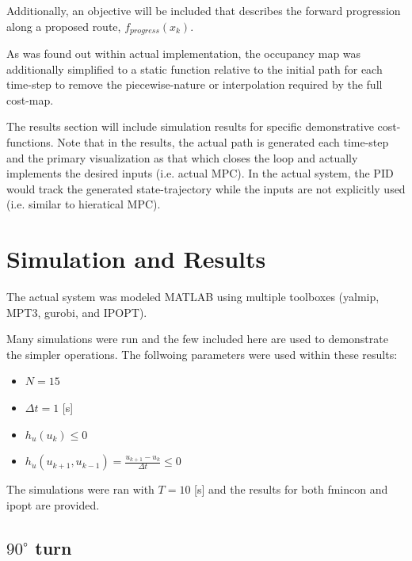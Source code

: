 \documentclass[]{IEEEtran}
\begin{document}
Additionally, an objective will be included that describes the forward progression along a proposed route, $f_{progress}(x_k)$.

As was found out within actual implementation, the occupancy map was additionally simplified to a static function relative to the initial path for each time-step to remove the piecewise-nature or interpolation required by the full cost-map.

The results section will include simulation results for specific demonstrative cost-functions.
Note that in the results, the actual path is generated each time-step and the primary visualization as that which closes the loop and actually implements the desired inputs (i.e. actual MPC).
In the actual system, the PID would track the generated state-trajectory while the inputs are not explicitly used (i.e. similar to hieratical MPC).

\section{Simulation and Results}\label{sec:sim_and_results}

The actual system was modeled MATLAB using multiple toolboxes (yalmip\cite{yalmip}, MPT3\cite{MPT3}, gurobi\cite{gurobi}, and IPOPT\cite{ipopt}).

Many simulations were run and the few included here are used to demonstrate the simpler operations.
The follwoing parameters were used within these results:
\begin{itemize}
    \item $N = 15$
    \item $\Delta t = 1$ [s]
    \item $h_{u}(u_k) \leq 0$ 
    \item $h_{\dot{u}}(u_{k+1},u_{k-1}) = \frac{u_{k+1}-u_{k}}{\Delta t}\leq 0$
\end{itemize}
The simulations were ran with $T = 10$ [s] and the results for both fmincon and ipopt are provided.

\subsection{$90^\circ$ turn}
\end{document}
